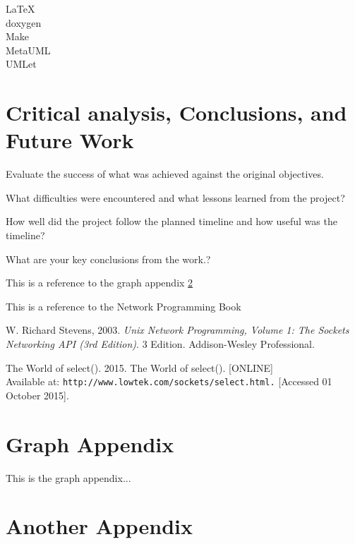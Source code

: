 \documentclass[12pt,a4paper,titlepage]{article}
\begin{document}
LaTeX\\
doxygen\\
Make\\
MetaUML\\
UMLet\\

\section{Critical analysis, Conclusions, and Future Work}

Evaluate the success of what was achieved against the original objectives. 

What difficulties were encountered and what lessons learned from the project? 

How well did the project follow the planned timeline and how useful was the timeline?  

What are your key conclusions from the work.?

This is a reference to the graph appendix \ref{appendix:graph}

This is a reference to the Network Programming Book \cite[p.~215]{stevensunp}

\newpage
%
\begin{thebibliography}{9}

W. Richard Stevens, 2003. \textit{Unix Network Programming, Volume 1: The Sockets Networking API (3rd Edition)}. 3 Edition. Addison-Wesley Professional.

The World of select(). 2015. The World of select(). [ONLINE] \\
Available at: \texttt{http://www.lowtek.com/sockets/select.html.} [Accessed 01 October 2015].

\end{thebibliography}

\newpage
\begin{appendices}

\section{Graph Appendix}
\label{appendix:graph}
This is the graph appendix...

\section{Another Appendix}

\end{appendices}
\end{document}
